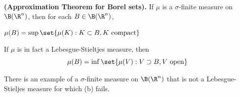 \documentclass{article} %
\begin{document}




\begin{theorem}
\textbf{(Approximation Theorem for Borel sets).} If $\mu$ is a $\sigma$-finite measure on $\B(\R^n)$, then for each $B \in \B(\R^n)$,
\begin{alphabate}
\item $\mu(B) = \sup \set{\mu(K) : K \subset B, K \text{ compact}}$
\item If $\mu$ is in fact a Lebesgue-Stieltjes measure, then
\[ \mu(B) = \inf \set{\mu(V) : V \supset B, V \text{ open}}\]
\item There is an example of a $\sigma$-finite measure on $\B(\R^n)$ that is not a Lebesgue-Stieljes measure for which (b) fails.
\end{alphabate}
\label{thm:approximation_theorem_for_borel_sets}	
\end{theorem}
\end{document}
